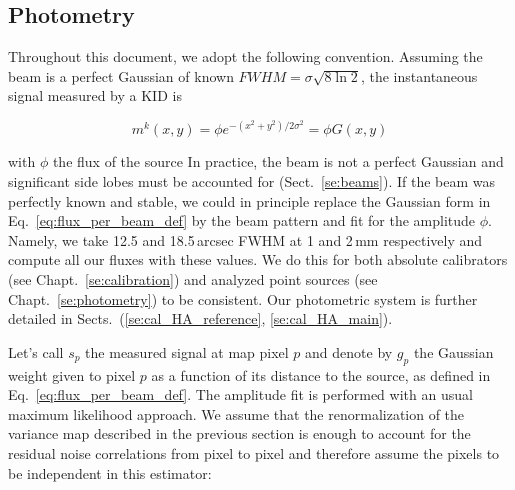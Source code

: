 \subsection{Photometry}
\label{se:intro_photometry}

Throughout this document, we adopt the following convention. Assuming the beam
is a perfect Gaussian of known $FWHM=\sigma\sqrt{8\ln 2}$, the instantaneous
signal measured by a KID is

\begin{equation}
m^k(x,y) = \phi e^{-(x^2+y^2)/2\sigma^2} = \phi G(x,y)
\label{eq:flux_per_beam_def}
\end{equation}

with $\phi$ the flux of the source  In practice, the beam is not a perfect Gaussian
and significant side lobes must be accounted for
(Sect.~\ref{se:beams}). If the beam was perfectly known and stable, we could in
principle replace the Gaussian form in Eq.~\ref{eq:flux_per_beam_def} by the
beam pattern and fit for the amplitude $\phi$.
 Namely, we take
12.5 and 18.5\,arcsec FWHM at 1 and 2\,mm respectively and compute all our fluxes with these
values. We do this for both absolute calibrators (see Chapt.~\ref{se:calibration})
and analyzed point sources (see Chapt.~\ref{se:photometry}) to be consistent. Our
photometric system is further detailed in
Sects.~(\ref{se:cal_HA_reference}, \ref{se:cal_HA_main}).


Let's call $s_p$ the measured signal at map pixel $p$ and denote by $g_p$ the
Gaussian weight given to pixel $p$ as a function of its distance to the source,
as defined in Eq.~\ref{eq:flux_per_beam_def}. The amplitude fit is performed
with an usual maximum likelihood approach. We assume that the renormalization of
the variance map described in the previous section is enough to account for the
residual noise correlations from pixel to pixel and therefore assume the pixels to
be independent in this estimator:

